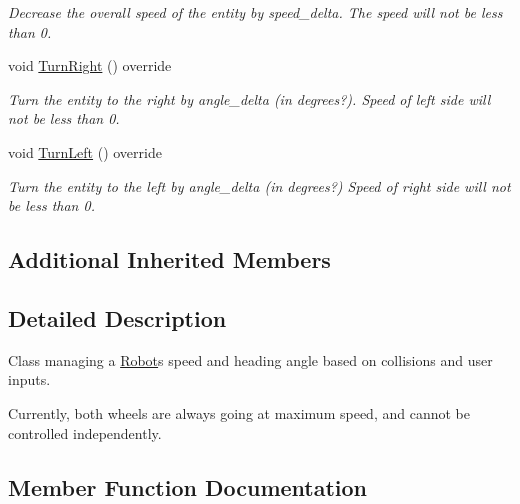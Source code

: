 \begin{DoxyCompactItemize}
\begin{DoxyCompactList}\small\item\em Decrease the overall speed of the entity by speed\+\_\+delta. The speed will not be less than 0. \end{DoxyCompactList}\item 
void \hyperlink{classMotionHandlerRobot_a4b18204b7c7f7f8a3cbb7f0e8ccf088f}{Turn\+Right} () override\hypertarget{classMotionHandlerRobot_a4b18204b7c7f7f8a3cbb7f0e8ccf088f}{}\label{classMotionHandlerRobot_a4b18204b7c7f7f8a3cbb7f0e8ccf088f}

\begin{DoxyCompactList}\small\item\em Turn the entity to the right by angle\+\_\+delta (in degrees?). Speed of left side will not be less than 0. \end{DoxyCompactList}\item 
void \hyperlink{classMotionHandlerRobot_a955ca2693c4188ffb08cfde469e58252}{Turn\+Left} () override\hypertarget{classMotionHandlerRobot_a955ca2693c4188ffb08cfde469e58252}{}\label{classMotionHandlerRobot_a955ca2693c4188ffb08cfde469e58252}

\begin{DoxyCompactList}\small\item\em Turn the entity to the left by angle\+\_\+delta (in degrees?) Speed of right side will not be less than 0. \end{DoxyCompactList}\end{DoxyCompactItemize}
\subsection*{Additional Inherited Members}


\subsection{Detailed Description}
Class managing a \hyperlink{classRobot}{Robot}\textquotesingle{}s speed and heading angle based on collisions and user inputs. 

Currently, both wheels are always going at maximum speed, and cannot be controlled independently. 

\subsection{Member Function Documentation}
